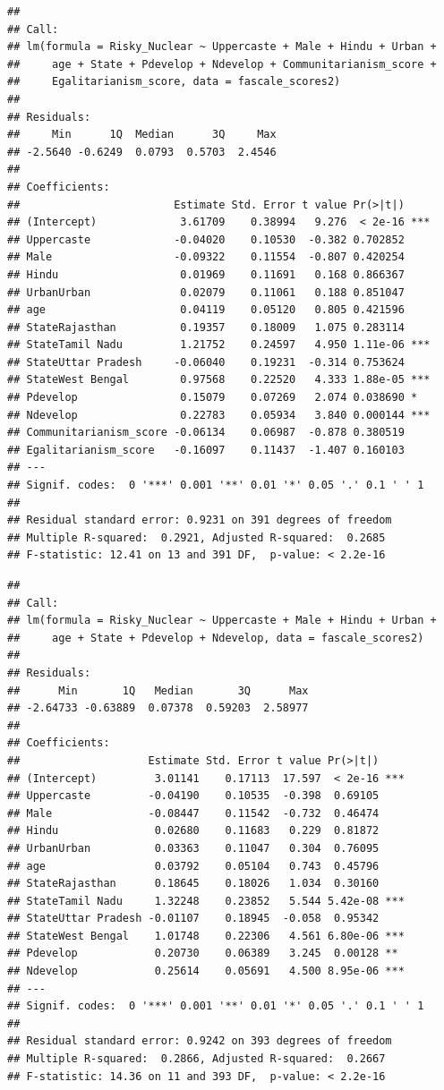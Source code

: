 \documentclass[
]{article}
\begin{document}
\begin{verbatim}
## 
## Call:
## lm(formula = Risky_Nuclear ~ Uppercaste + Male + Hindu + Urban + 
##     age + State + Pdevelop + Ndevelop + Communitarianism_score + 
##     Egalitarianism_score, data = fascale_scores2)
## 
## Residuals:
##     Min      1Q  Median      3Q     Max 
## -2.5640 -0.6249  0.0793  0.5703  2.4546 
## 
## Coefficients:
##                        Estimate Std. Error t value Pr(>|t|)    
## (Intercept)             3.61709    0.38994   9.276  < 2e-16 ***
## Uppercaste             -0.04020    0.10530  -0.382 0.702852    
## Male                   -0.09322    0.11554  -0.807 0.420254    
## Hindu                   0.01969    0.11691   0.168 0.866367    
## UrbanUrban              0.02079    0.11061   0.188 0.851047    
## age                     0.04119    0.05120   0.805 0.421596    
## StateRajasthan          0.19357    0.18009   1.075 0.283114    
## StateTamil Nadu         1.21752    0.24597   4.950 1.11e-06 ***
## StateUttar Pradesh     -0.06040    0.19231  -0.314 0.753624    
## StateWest Bengal        0.97568    0.22520   4.333 1.88e-05 ***
## Pdevelop                0.15079    0.07269   2.074 0.038690 *  
## Ndevelop                0.22783    0.05934   3.840 0.000144 ***
## Communitarianism_score -0.06134    0.06987  -0.878 0.380519    
## Egalitarianism_score   -0.16097    0.11437  -1.407 0.160103    
## ---
## Signif. codes:  0 '***' 0.001 '**' 0.01 '*' 0.05 '.' 0.1 ' ' 1
## 
## Residual standard error: 0.9231 on 391 degrees of freedom
## Multiple R-squared:  0.2921, Adjusted R-squared:  0.2685 
## F-statistic: 12.41 on 13 and 391 DF,  p-value: < 2.2e-16
\end{verbatim}

\begin{verbatim}
## 
## Call:
## lm(formula = Risky_Nuclear ~ Uppercaste + Male + Hindu + Urban + 
##     age + State + Pdevelop + Ndevelop, data = fascale_scores2)
## 
## Residuals:
##      Min       1Q   Median       3Q      Max 
## -2.64733 -0.63889  0.07378  0.59203  2.58977 
## 
## Coefficients:
##                    Estimate Std. Error t value Pr(>|t|)    
## (Intercept)         3.01141    0.17113  17.597  < 2e-16 ***
## Uppercaste         -0.04190    0.10535  -0.398  0.69105    
## Male               -0.08447    0.11542  -0.732  0.46474    
## Hindu               0.02680    0.11683   0.229  0.81872    
## UrbanUrban          0.03363    0.11047   0.304  0.76095    
## age                 0.03792    0.05104   0.743  0.45796    
## StateRajasthan      0.18645    0.18026   1.034  0.30160    
## StateTamil Nadu     1.32248    0.23852   5.544 5.42e-08 ***
## StateUttar Pradesh -0.01107    0.18945  -0.058  0.95342    
## StateWest Bengal    1.01748    0.22306   4.561 6.80e-06 ***
## Pdevelop            0.20730    0.06389   3.245  0.00128 ** 
## Ndevelop            0.25614    0.05691   4.500 8.95e-06 ***
## ---
## Signif. codes:  0 '***' 0.001 '**' 0.01 '*' 0.05 '.' 0.1 ' ' 1
## 
## Residual standard error: 0.9242 on 393 degrees of freedom
## Multiple R-squared:  0.2866, Adjusted R-squared:  0.2667 
## F-statistic: 14.36 on 11 and 393 DF,  p-value: < 2.2e-16
\end{verbatim}
\end{document}
